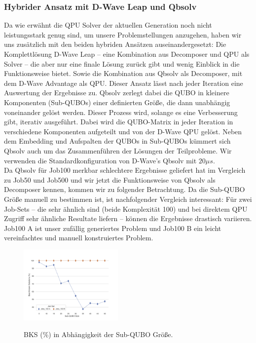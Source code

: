 \subsubsection{Hybrider Ansatz mit D-Wave Leap und Qbsolv}
\label{subsubsec:hybrid}
Da wie erwähnt die QPU Solver der aktuellen Generation noch nicht leistungsstark genug sind, um unsere Problemstellungen anzugehen, haben wir uns zusätzlich mit den beiden hybriden Ansätzen auseinandergesetzt: Die Komplettlösung D-Wave Leap \cite{Leap2020} -- eine Kombination aus Decomposer und QPU als Solver -- die aber nur eine finale Lösung zurück gibt und wenig Einblick in die Funktionsweise bietet. Sowie die Kombination aus Qbsolv \cite{Qbsolv2017} als Decomposer, mit dem D-Wave Advantage als QPU. Dieser Ansatz lässt nach jeder Iteration eine Auswertung der Ergebnisse zu. Qbsolv zerlegt dabei die QUBO in kleinere Komponenten (Sub-QUBOs) einer definierten Größe, die dann unabhängig voneinander gelöst werden. Dieser Prozess wird, solange es eine Verbesserung gibt, iterativ ausgeführt. Dabei wird die QUBO-Matrix in jeder Iteration in verschiedene Komponenten aufgeteilt und von der D-Wave QPU gelöst. Neben dem Embedding und Aufspalten der QUBOs in Sub-QUBOs kümmert sich Qbsolv auch um das  Zusammenführen der Lösungen der Teilprobleme. Wir verwenden die Standardkonfiguration von D-Wave's Qbsolv mit $20 \mu s$.\\
Da Qbsolv für Job100 merkbar schlechtere Ergebnisse geliefert hat im Vergleich zu Job50 und Job500 und wir jetzt die Funktionsweise von Qbsolv als Decomposer kennen, kommen wir zu folgender Betrachtung. Da die Sub-QUBO Größe manuell zu bestimmen ist, ist nachfolgender Vergleich interessant: Für zwei Job-Sets -- die sehr ähnlich sind (beide Komplexität 100) und bei direktem QPU Zugriff sehr ähnliche Resultate liefern -- können die Ergebnisse drastisch variieren. Job100 A ist unser zufällig generiertes Problem und Job100 B ein leicht vereinfachtes und manuell konstruiertes Problem.
\begin{figure}[H]
  \centering
  \includegraphics[width=0.45\textwidth]{images/Optimal Sub-QUBO Size.png}
  \label{fig:SubQUBO}
  \caption{BKS (\%) in Abhängigkeit der Sub-QUBO Größe.}
\end{figure}

